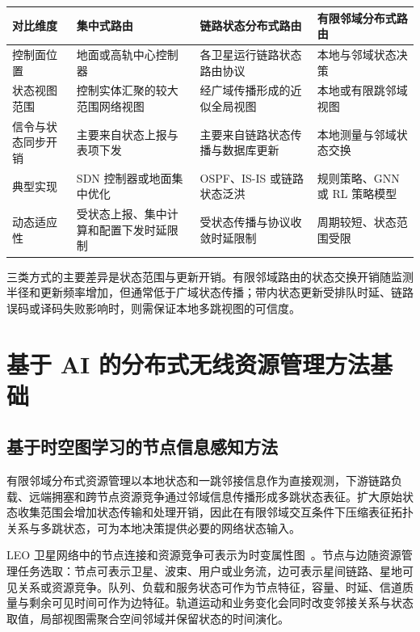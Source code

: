 \begin{table}[!htp]
\centering
{}
\label{tab:routing_architecture_comparison}
\small
\setlength{\tabcolsep}{6pt}
\renewcommand{\arraystretch}{1.3}
\begin{tabular}{p{} p{} p{} p{}}
\hline
对比维度 & 集中式路由 & 链路状态分布式路由 & 有限邻域分布式路由 \\
\hline
控制面位置
& 地面或高轨中心控制器
& 各卫星运行链路状态路由协议
    & 本地与邻域状态决策 \\
\hline
状态视图范围
& 控制实体汇聚的较大范围网络视图
& 经广域传播形成的近似全局视图
& 本地或有限跳邻域视图 \\
\hline
信令与状态同步开销
& 主要来自状态上报与表项下发
& 主要来自链路状态传播与数据库更新
    & 本地测量与邻域状态交换 \\
\hline
典型实现
& SDN 控制器或地面集中优化
& OSPF、IS-IS 或链路状态泛洪
& 规则策略、GNN 或 RL 策略模型 \\
\hline
动态适应性
& 受状态上报、集中计算和配置下发时延限制
& 受状态传播与协议收敛时延限制
    & 周期较短、状态范围受限 \\
\hline
\end{tabular}
\end{table}

三类方式的主要差异是状态范围与更新开销。有限邻域路由的状态交换开销随监测半径和更新频率增加，但通常低于广域状态传播；带内状态更新受排队时延、链路误码或译码失败影响时，则需保证本地多跳视图的可信度。


\section{基于 AI 的分布式无线资源管理方法基础}

\subsection{基于时空图学习的节点信息感知方法}

有限邻域分布式资源管理以本地状态和一跳邻接信息作为直接观测，下游链路负载、远端拥塞和跨节点资源竞争通过邻域信息传播形成多跳状态表征。扩大原始状态收集范围会增加状态传输和处理开销，因此在有限邻域交互条件下压缩表征拓扑关系与多跳状态，可为本地决策提供必要的网络状态输入。

LEO 卫星网络中的节点连接和资源竞争可表示为时变属性图~\cite{zhou2021graphneuralnetworksreview}。节点与边随资源管理任务选取：节点可表示卫星、波束、用户或业务流，边可表示星间链路、星地可见关系或资源竞争。队列、负载和服务状态可作为节点特征，容量、时延、信道质量与剩余可见时间可作为边特征。轨道运动和业务变化会同时改变邻接关系与状态取值，局部视图需聚合空间邻域并保留状态的时间演化。

